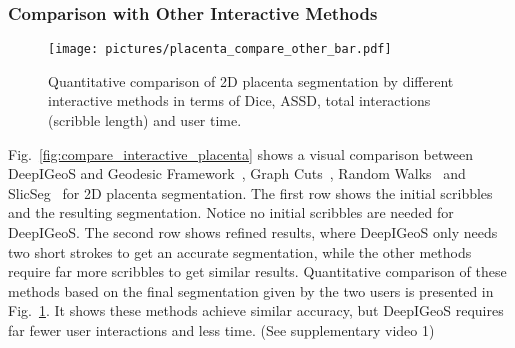 \documentclass[10pt,journal,compsoc]{IEEEtran}
\begin{document}
\subsubsection{Comparison with Other Interactive Methods}

\begin{comment}
\begin{table*}
	\centering
	\small
	\caption{Quantitative evaluation of placenta segmentation by DeepIGeoS and other interactive methods.}
	\label{tab:r-compare_interactive_placenta}
	\begin{tabular}{lllllll}
		\hline
		Method & Dice(\%) & ASSD(pixels) & Scribble(pixels) & User time(s) & Machine time(s)& Iterations\\ \hline
		DeepIGeoS & 91.16$\pm$3.17 & 1.04$\pm$0.33 & 8.33$\pm$5.26&5.31$\pm$3.44 & 0.69$\pm$0.30 & 2.06$\pm$0.64\\
		GeoS       & 86.88$\pm$4.29 & 1.54$\pm$0.49 & 133.32$\pm$46.35 & 18.00$\pm$6.64 & 0.25$\pm$0.22 & 2.65$\pm$1.25\\ 
		
		Graph Cuts        & 88.23$\pm$3.85  & 1.38$\pm$0.38 & 135.09$\pm$45.10 & 21.07$\pm$7.46 & 0.06$\pm$0.04 & 2.86$\pm$1.24\\
		Random Walks & 87.90$\pm$3.46  & 1.40$\pm$0.37 & 163.42$\pm$51.76 & 17.74$\pm$5.31 & 0.11$\pm$0.04 & 2.69$\pm$1.10\\
		SlicSeg  & 88.48$\pm$3.25 & 1.29$\pm$0.32  & 80.59$\pm$24.37 & 13.82$\pm$4.78 & 0.61$\pm$0.37 & 2.04$\pm$0.92\\  
		\hline
	\end{tabular}
\end{table*}
\end{comment}

\begin{figure}[t]
	\centering
	\texttt{[image: pictures/placenta\_compare\_other\_bar.pdf]}
	\caption[Quantitative comparison of 2D placenta segmentation by different interactive methods]{ 
		Quantitative comparison of 2D placenta segmentation by different interactive methods in terms of Dice, ASSD, total interactions (scribble length) and user time.} 
	\label{fig:placenta_compare_other}
\end{figure}
Fig.~\ref{fig:compare_interactive_placenta} shows a visual comparison between DeepIGeoS and Geodesic Framework~\cite{Bai2007}, Graph Cuts~\cite{Boykov2001}, Random Walks~\cite{Grady2006a} and SlicSeg~\cite{Wang2016} for 2D placenta segmentation. The first row shows the initial scribbles and the resulting segmentation. Notice no initial scribbles are needed for DeepIGeoS. The second row shows refined results, where DeepIGeoS only needs two short strokes to get an accurate segmentation, while the other methods require far more scribbles to get similar results. Quantitative comparison of these methods based on the final segmentation given by the two users is presented in Fig.~\ref{fig:placenta_compare_other}. It shows these methods achieve similar accuracy, but DeepIGeoS requires far fewer user interactions and less time. (See supplementary video 1)
\end{document}

